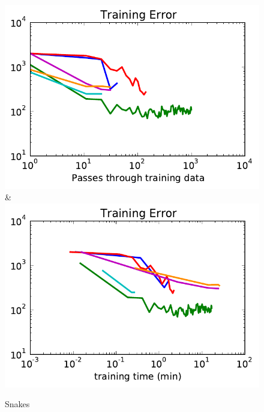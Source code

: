 \begin{figure}
\begin{tabu}
    \includegraphics[width=\linewidth]{evaluation/images/snakes_qpbo_loss}&%
    \includegraphics[width=\linewidth]{evaluation/images/snakes_qpbo_time_loss}
    \end{tabu}
\caption{%
    Snakes
}
\end{figure}


